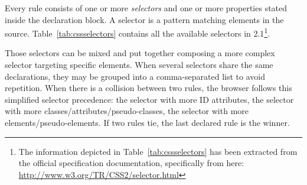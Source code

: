 Every rule consists of one or more \emph{selectors} and one or more properties stated inside the declaration block.
A selector is a pattern matching elements in the  source.
Table~\vref{tab:cssselectors} contains all the available selectors in  2.1\footnote{The information depicted in Table~\ref{tab:cssselectors} has been extracted from the official specification documentation, specifically from here: \url{http://www.w3.org/TR/CSS2/selector.html}}.

Those selectors can be mixed and put together composing a more complex selector targeting specific elements.
When several selectors share the same declarations, they may be grouped into a comma-separated list to avoid repetition.
When there is a collision between two rules, the browser follows this simplified selector precedence: the selector with more ID attributes, the selector with more classes/attributes/pseudo-classes, the selector with more elements/pseudo-elements.
If two rules tie, the last declared rule is the winner.

